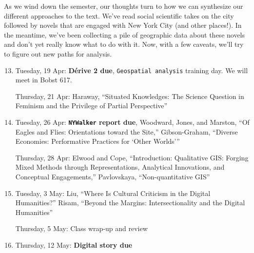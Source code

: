 As we wind down the semester, our thoughts turn to how we can synthesize our
different approaches to the text. We’ve read social scientific takes on the
city followed by novels that are engaged with New York City (and other
places!). In the meantime, we’ve been collecting a pile of geographic data
about these novels and don’t yet really know what to do with it. Now, with a
few caveats, we’ll try to figure out new paths for analysis.

\begin{enumerate}
  \setcounter{enumi}{12}

  \item Tuesday, 19 Apr: \textbf{\small Dérive 2 due}, \texttt{Geospatial analysis} training day. We will meet in Bobst 617.

    Thursday, 21 Apr: Haraway, “Situated Knowledges: The Science Question in Feminism and the Privilege of Partial Perspective”

  \item Tuesday, 26 Apr: \textbf{\texttt{NYWalker} \small report due}, Woodward, Jones, and Marston, “Of Eagles and Flies: Orientations toward the Site,” Gibson-Graham, “Diverse Economies: Performative Practices for ‘Other Worlds’”

    Thursday, 28 Apr: Elwood and Cope, “Introduction: Qualitative GIS: Forging Mixed Methods through Representations, Analytical Innovations, and Conceptual Engagements,”  Pavlovskaya, “Non-quantitative GIS”

  \item Tuesday, 3 May: Liu, “Where Is Cultural Criticism in the Digital Humanities?” Risam, “Beyond the Margins: Intersectionality and the Digital Humanities”

    Thursday, 5 May: Class wrap-up and review

  \item Thursday, 12 May: \textbf{\small Digital story due}

\end{enumerate}
